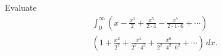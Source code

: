 Evaluate
\begin{gather*}
\int_0^\infty \left(x-\frac{x^3}{2}+\frac{x^5}{2\cdot
4}-\frac{x^7}{2\cdot 4\cdot 6}+\cdots\right) \\
\left(1+\frac{x^2}{2^2}+
\frac{x^4}{2^2\cdot 4^2}+\frac{x^6}{2^2\cdot 4^2 \cdot 6^2}+\cdots\right)\,dx.
\end{gather*}
